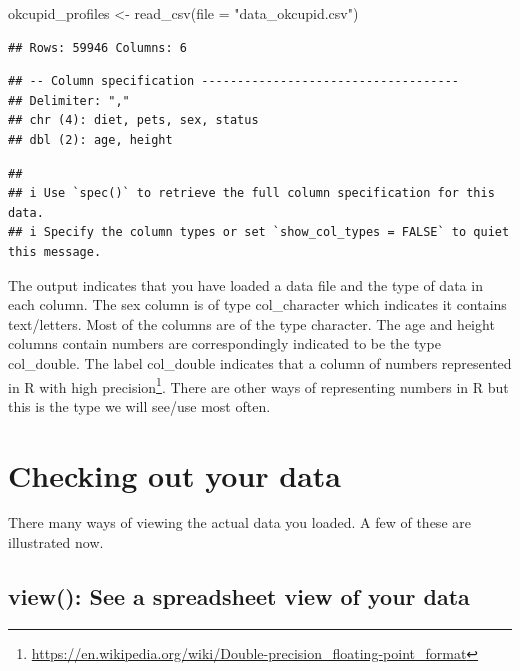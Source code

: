 \documentclass[
]{krantz}
\makeatletter
\newenvironment{Shaded}{\begin{snugshade}}{\end{snugshade}}
\newcommand{\AttributeTok}[1]{\textcolor[rgb]{0.61,0.61,0.61}{#1}}
\newcommand{\FunctionTok}[1]{\textcolor[rgb]{0,0,0}{#1}}
\newcommand{\NormalTok}[1]{#1}
\newcommand{\OtherTok}[1]{\textcolor[rgb]{0.37,0.37,0.37}{#1}}
\newcommand{\StringTok}[1]{\textcolor[rgb]{0.5,0.5,0.5}{#1}}
\renewcommand{\href}[2]{#2\footnote{\url{#1}}}
\newenvironment{kframe}{%
\medskip{}
\setlength{\fboxsep}{.8em}
 \def\at@end@of@kframe{}%
 \ifinner\ifhmode%
  \def\at@end@of@kframe{\end{minipage}}%
  \begin{minipage}{\columnwidth}%
 \fi\fi%
 \def\FrameCommand##1{\hskip\@totalleftmargin \hskip-\fboxsep
 \colorbox{shadecolor}{##1}\hskip-\fboxsep
     \hskip-\linewidth \hskip-\@totalleftmargin \hskip\columnwidth}%
 \MakeFramed {\advance\hsize-\width
   \@totalleftmargin\z@ \linewidth\hsize
   \@setminipage}}%
 {\par\unskip\endMakeFramed%
 \at@end@of@kframe}
\renewenvironment{Shaded}{\begin{kframe}}{\end{kframe}}
\makeatother
\begin{document}
\begin{Shaded}
\begin{Highlighting}[]
\NormalTok{okcupid\_profiles }\OtherTok{\textless{}{-}} \FunctionTok{read\_csv}\NormalTok{(}\AttributeTok{file =} \StringTok{"data\_okcupid.csv"}\NormalTok{)}
\end{Highlighting}
\end{Shaded}

\begin{verbatim}
## Rows: 59946 Columns: 6
\end{verbatim}

\begin{verbatim}
## -- Column specification ------------------------------------
## Delimiter: ","
## chr (4): diet, pets, sex, status
## dbl (2): age, height
\end{verbatim}

\begin{verbatim}
## 
## i Use `spec()` to retrieve the full column specification for this data.
## i Specify the column types or set `show_col_types = FALSE` to quiet this message.
\end{verbatim}

The output indicates that you have loaded a data file and the type of data in each column. The sex column is of type col\_character which indicates it contains text/letters. Most of the columns are of the type character. The age and height columns contain numbers are correspondingly indicated to be the type col\_double. The label col\_double indicates that a column of numbers represented in R with \href{https://en.wikipedia.org/wiki/Double-precision_floating-point_format}{high precision}. There are other ways of representing numbers in R but this is the type we will see/use most often.

\hypertarget{checking-out-your-data}{%
\section{Checking out your data}\label{checking-out-your-data}}

There many ways of viewing the actual data you loaded. A few of these are illustrated now.

\hypertarget{view-see-a-spreadsheet-view-of-your-data}{%
\subsection{view(): See a spreadsheet view of your data}\label{view-see-a-spreadsheet-view-of-your-data}}
\end{document}
